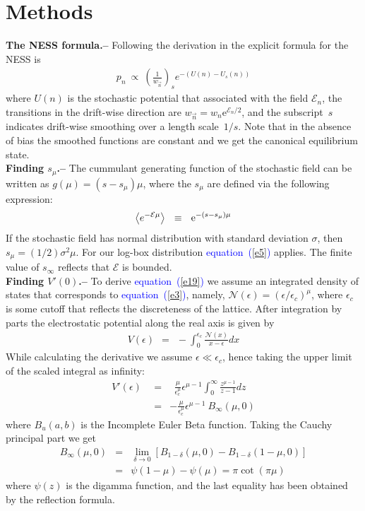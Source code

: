 \documentclass[aps,pre,floats,floatfix,twocolumn]{revtex4}
\newcommand{\eexp}[1]{\mathrm{e}^{#1}}
\newcommand{\be}[1]{\begin{eqnarray}\ifthenelse{#1=-1}{\nonumber}{\ifthenelse{#1=0}{}{\label{e#1}}}}
\newcommand{\beq}{\begin{eqnarray}}
\newcommand{\eeq}{\end{eqnarray}}
\newcommand{\Eq}[1]{\textcolor{blue}{{equation}\!~(\ref{#1})}}
\newcommand{\sect}[1]{{\bf #1.-- }}
\begin{document}
\section{Methods}  



\sect{The NESS formula}
%
Following the derivation in \cite{nes} the explicit formula for the NESS is   
%
\beq
p_n \ \propto \ \left( \frac{1}{w_{\overrightarrow{n}}}\right)_s e^{-\left(U(n)-U_s(n)\right)}
\eeq
%
where $U(n)$ is the stochastic potential that associated with the field $\mathcal{E}_n$, 
the transitions in the drift-wise direction are $w_{\overrightarrow{n}}=w_n\eexp{\mathcal{E}_n/2}$, 
and the subscript~$s$ indicates drift-wise smoothing over a length scale~$1/s$. 
Note that in the absence of bias the smoothed functions are constant and we get the canonical equilibrium state.    
\\

\sect{Finding $s_{\mu}$}
%
The cummulant generating function of the stochastic field 
can be written as $g(\mu)=(s-s_{\mu})\mu$,  
where the $s_{\mu}$ are defined via the following expression:   
%
\be{362}
\left\langle  e^{-\mathcal{E}\mu}\right\rangle \ \ \equiv \ \ \eexp{-(s-s_{\mu})\mu} 
\eeq
%  
If the stochastic field has normal distribution 
with standard deviation $\sigma$, then ${s_{\mu}=(1/2) \sigma^2 \mu}$.
For our log-box distribution \Eq{e5} applies. 
The finite value of $s_{\infty}$ reflects that $\mathcal{E}$ is bounded.  
\\

\sect{Finding $V'(0)$}
%
To derive \Eq{e19} we assume an integrated density of states that corresponds to \Eq{e3}, 
namely, ${\mathcal{N}(\epsilon) = (\epsilon/\epsilon_c)^{\mu}}$, 
where $\epsilon_c$ is some cutoff that reflects the discreteness of the lattice.
After integration by parts the electrostatic potential along the real axis is given by 
%
\beq
V(\epsilon) \ \ = \ \ -  \int_0^{\epsilon_c} \frac{\mathcal{N}(x)}{x-\epsilon}dx
\eeq
%
While calculating the derivative we assume ${\epsilon \ll \epsilon_c}$, 
hence taking the upper limit of the scaled integral as infinity: 
%
\beq
V'(\epsilon) \ \ &=& \ \ 
\frac{\mu}{\epsilon_c^{\mu}} \epsilon^{\mu-1} \int_0^{\infty} \frac{z^{\mu-1}}{z-1}dz 
\\
&=&   
-\frac{\mu}{\epsilon_c^{\mu}}  \epsilon^{\mu-1} \ B_{\infty}(\mu,0)
\eeq  
%
where $B_u(a,b)$ is the Incomplete Euler Beta function.
Taking the Cauchy principal part we get
%
\beq
B_{\infty}(\mu,0) &=&  
\lim_{\delta \to 0}  \left[ B_{1-\delta}(\mu,0) - B_{1-\delta}(1-\mu,0) \right]  
\\
&=& \psi(1-\mu)-\psi(\mu) = \pi \cot(\pi \mu)
\eeq
%
where $\psi(z)$ is the digamma function,
and the last equality has been obtained by the reflection formula. 
\\
\end{document}
